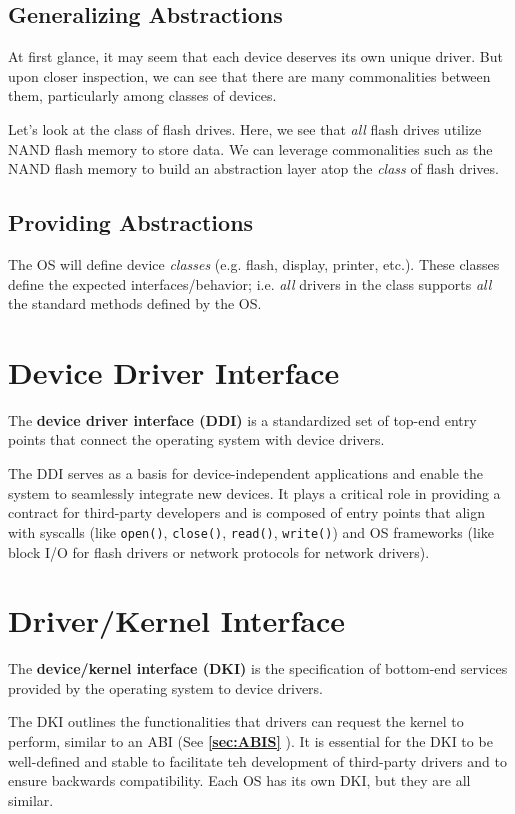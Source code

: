 \documentclass{report}
\newcommand{\definitionBegin}[1]{\begin{tcolorbox}[title={Definition: #1}]}
\newcommand{\definitionEnd}{\end{tcolorbox}}
\newcommand{\exampleBegin}[1]{\begin{tcolorbox}[colback=blue!5!white,colframe=black!75!blue,title={Example:
      #1}]}
\newcommand{\exampleEnd}{\end{tcolorbox}}
\newcommand{\refto}[2]{\textbf{\ref{#1:#2} \nameref{#1:#2}}}
\begin{document}
\subsection{Generalizing Abstractions}
At first glance, it may seem that each device deserves its own unique driver. But upon closer
inspection, we can see that there are many commonalities between them, particularly among classes
of devices.

\exampleBegin{Class of Devices}
Let's look at the class of flash drives. Here, we see that \textit{all} flash drives utilize NAND
flash memory to store data. We can leverage commonalities such as the NAND flash memory to build an
abstraction layer atop the \textit{class} of flash drives.
\exampleEnd


\subsection{Providing Abstractions}
The OS will define device \textit{classes} (e.g. flash, display, printer, etc.). These classes
define the expected interfaces/behavior; i.e. \textit{all} drivers in the class supports
\textit{all} the standard methods defined by the OS. 


\section{Device Driver Interface}
\definitionBegin{Device Driver Interface}
The \textbf{device driver interface (DDI)} is a standardized set of top-end entry points that
connect the operating system with device drivers.
\definitionEnd

The DDI serves as a basis for device-independent applications and enable the system to seamlessly
integrate new devices. It plays a critical role in providing a contract for third-party developers
and is composed of entry points that align with syscalls (like \texttt{open()}, \texttt{close()},
\texttt{read()}, \texttt{write()}) and OS frameworks (like block I/O for flash drivers or network
protocols for network drivers).


\section{Driver/Kernel Interface}
\definitionBegin{Device/Kernel Interface}
The \textbf{device/kernel interface (DKI)} is the specification of bottom-end services provided by
the operating system to device drivers.
\definitionEnd

The DKI outlines the functionalities that drivers can request the kernel to perform, similar to an
ABI (See \refto{sec}{ABIS}). It is essential for the DKI to be well-defined and stable to facilitate
teh development of third-party drivers and to ensure backwards compatibility. Each OS has its own
DKI, but they are all similar.
\end{document}
